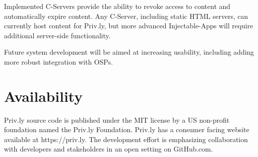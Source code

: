 \documentclass[letterpaper,twocolumn,10pt]{article}
\begin{document}
Implemented C-Servers provide the ability to revoke access to content and
automatically expire content. Any C-Server, including static HTML servers, can currently host content 
for Priv.ly, but more advanced Injectable-Apps will require additional server-side 
functionality.

Future system development will be aimed at increasing 
usability, including adding more robust integration with OSPs.


\section{Availability} \label{sec:privly_availability}

Priv.ly source code is published under the MIT license by a US non-profit 
foundation named the Priv.ly Foundation. Priv.ly has a consumer facing website 
available at https://priv.ly. The 
development effort is emphasizing collaboration with developers and stakeholders 
in an open setting on GitHub.com.

{\footnotesize 
}
\end{document}
